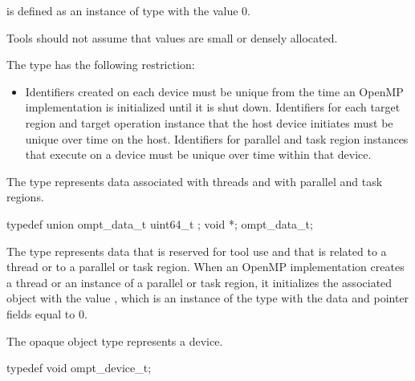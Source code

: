  is defined as an instance of type  
with the value 0.

Tools should not assume that  values are small or densely allocated.

\restrictions
The  type has the following restriction:

\format
\begin{itemize}
\item Identifiers created on each device must be unique from the time an OpenMP 
      implementation is initialized until it is shut down. Identifiers for each 
      target region and target operation instance that the host device initiates
      must be unique over time on the host. Identifiers for parallel and task 
      region instances that execute on a device must be unique over time within 
      that device.
\end{itemize}



\label{sec:ompt_data_t}

\summary
The  type represents data associated with threads and 
with parallel and task regions.

\format
\begin{ccppspecific}
\begin{omptOther}
typedef union ompt_data_t {
  uint64_t ;
  void *;
} ompt_data_t;
\end{omptOther}
\end{ccppspecific}

\descr
The  type represents data that is reserved for tool use and
that is related to a thread or to a parallel or task region. When an OpenMP 
implementation creates a thread or an instance of a parallel or task region, 
it initializes the associated  object with the value 
, which is an instance of the type with the data and 
pointer fields equal to 0.



\label{sec:ompt_device_t}

\summary
The  opaque object type represents a device.

\format
\begin{ccppspecific}
\begin{omptOther}
typedef void ompt_device_t;
\end{omptOther}
\end{ccppspecific}



